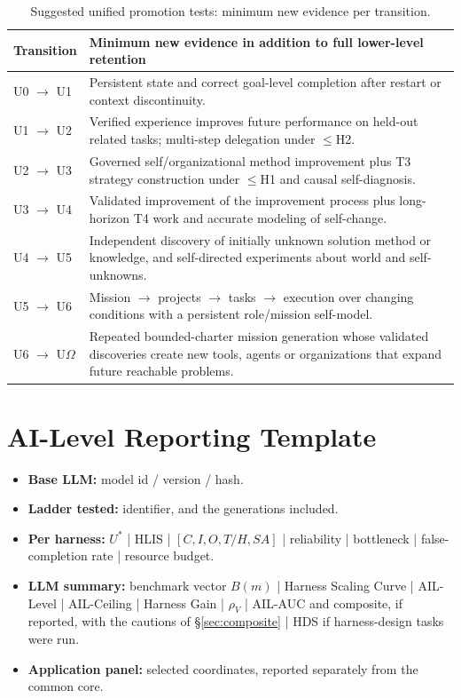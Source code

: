 \documentclass[11pt]{article}
\theoremstyle{definition}
\newcommand{\Om}{\ensuremath{\Omega}}
\newcommand{\rhov}{\ensuremath{\rho_V}}
\begin{document}
\begin{table}[!htbp]
\centering\small
\begin{tabularx}{\textwidth}{@{}lY@{}}
\toprule
Transition & Minimum new evidence in addition to full lower-level retention \\
\midrule
U0 $\to$ U1 & Persistent state and correct goal-level completion after restart or context discontinuity. \\
U1 $\to$ U2 & Verified experience improves future performance on held-out related tasks; multi-step delegation under $\le$H2. \\
U2 $\to$ U3 & Governed self/organizational method improvement plus T3 strategy construction under $\le$H1 and causal self-diagnosis. \\
U3 $\to$ U4 & Validated improvement of the improvement process plus long-horizon T4 work and accurate modeling of self-change. \\
U4 $\to$ U5 & Independent discovery of initially unknown solution method or knowledge, and self-directed experiments about world and self-unknowns. \\
U5 $\to$ U6 & Mission $\to$ projects $\to$ tasks $\to$ execution over changing conditions with a persistent role/mission self-model. \\
U6 $\to$ U\Om{} & Repeated bounded-charter mission generation whose validated discoveries create new tools, agents or organizations that expand future reachable problems. \\
\bottomrule
\end{tabularx}
\caption{Suggested unified promotion tests: minimum new evidence per transition.}
\label{tab:promotion}
\end{table}

\section{AI-Level Reporting Template}

\begin{itemize}
\item \textbf{Base LLM:} model id / version / hash.
\item \textbf{Ladder tested:} identifier, and the generations included.
\item \textbf{Per harness:} $U^{*}$ | HLIS | $[C,I,O,T/H,SA]$ | reliability | bottleneck | false-completion rate | resource budget.
\item \textbf{LLM summary:} benchmark vector $B(m)$ | Harness Scaling Curve | AIL-Level | AIL-Ceiling | Harness Gain | \rhov{} | AIL-AUC and composite, if reported, with the cautions of \S\ref{sec:composite} | HDS if harness-design tasks were run.
\item \textbf{Application panel:} selected coordinates, reported separately from the common core.
\end{itemize}
\end{document}
